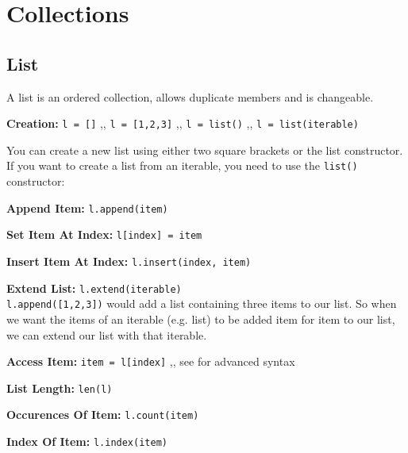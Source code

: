 \section{Collections}

    \subsection{List} \label{List}
        A list is an ordered collection, allows duplicate members and is changeable.

        \begin{indentblock}
            \textbf{Creation:} \texttt{l = []} \sep{,} \texttt{l = [1,2,3]}
        \sep{,} \texttt{l = list()} \sep{,} \texttt{l = list(iterable)}

        You can create a new list using either two square brackets or the list constructor.
        If you want to create a list from an iterable, you need to use the
        \texttt{list()} constructor:


            \textbf{Append Item:} \texttt{l.append(item)}

            \textbf{Set Item At Index:} \texttt{l[index] = item}

            \textbf{Insert Item At Index:} \texttt{l.insert(index, item)}

            \textbf{Extend List:} \texttt{l.extend(iterable)} \\
        \texttt{l.append([1,2,3])} would add a list containing three items to our list.
        So when we want the items of an iterable (e.g. list) to be added item for item to our list,
        we can extend our list with that iterable.


            \textbf{Access Item:} \texttt{item = l[index]} \sep{,}
        see  for advanced syntax

            \textbf{List Length:} \texttt{len(l)}

            \textbf{Occurences Of Item:} \texttt{l.count(item)}

            \textbf{Index Of Item:} \texttt{l.index(item)}


\end{indentblock}
